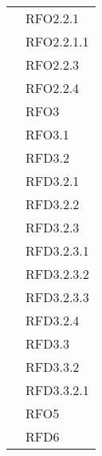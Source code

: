 \begin{longtable}{|>{\centering}m{10cm}|m{3cm}<{\centering}|}
& RFO2.2.1\\
& RFO2.2.1.1\\
& RFO2.2.3\\
& RFO2.2.4\\
& RFO3\\
& RFO3.1\\
& RFD3.2\\
& RFD3.2.1\\
& RFD3.2.2\\
& RFD3.2.3\\
& RFD3.2.3.1\\
& RFD3.2.3.2\\
& RFD3.2.3.3\\
& RFD3.2.4\\
& RFD3.3\\
& RFD3.3.2\\
& RFD3.3.2.1\\
& RFO5\\
& RFD6\\ \hline


\end{longtable}
